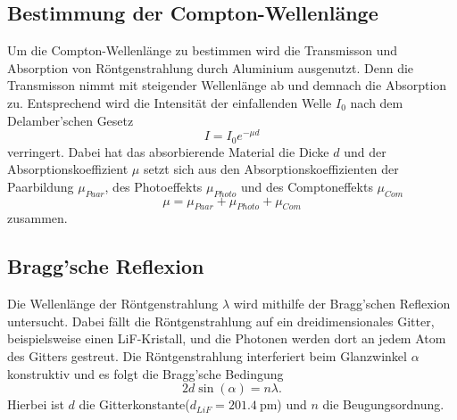 \subsection{Bestimmung der Compton-Wellenlänge}
Um die Compton-Wellenlänge zu bestimmen wird die Transmisson und Absorption von Röntgenstrahlung durch Aluminium ausgenutzt.
Denn die Transmisson nimmt mit steigender Wellenlänge ab und demnach die Absorption zu. Entsprechend wird die Intensität der
einfallenden Welle $I_0$ nach dem Delamber'schen Gesetz
\begin{equation}
    I = I_0 e^{-\mu d}
\end{equation}
verringert. Dabei hat das absorbierende Material die Dicke $d$ und der Absorptionskoeffizient $\mu$ setzt sich aus den Absorptionskoeffizienten
der Paarbildung $\mu_{Paar}$, des Photoeffekts $\mu_{Photo}$ und des Comptoneffekts $\mu_{Com}$
\begin{equation*}
    \mu = \mu_{Paar} + \mu_{Photo} + \mu_{Com}
\end{equation*}
zusammen.
\subsection{Bragg'sche Reflexion}
Die Wellenlänge der Röntgenstrahlung $\lambda$ wird mithilfe der Bragg'schen Reflexion untersucht. Dabei fällt die Röntgenstrahlung auf ein dreidimensionales
Gitter, beispielsweise einen LiF-Kristall, und die Photonen werden dort an jedem Atom des Gitters gestreut. Die Röntgenstrahlung interferiert beim Glanzwinkel $\alpha$ konstruktiv
und es folgt die Bragg'sche Bedingung
\begin{equation}
    \label{eqn:Bragg}
    2d\sin\left(\alpha\right) = n\lambda.
\end{equation}
Hierbei ist $d$ die Gitterkonstante($d_{LiF} = \SI{201,4}{\pico\meter}$) und $n$ die Beugungsordnung.
